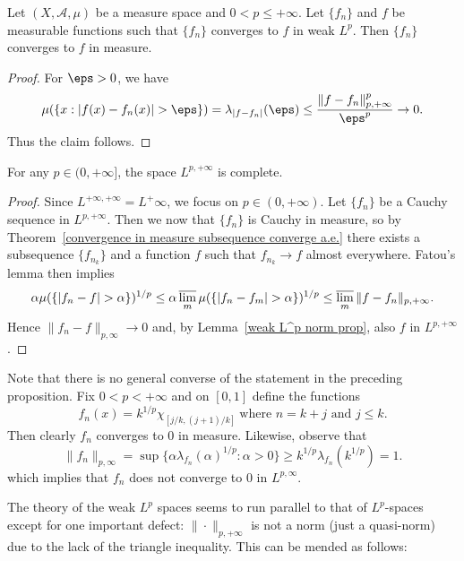 \begin{proposition}
Let $(X,\mathcal{A},\mu)$ be a measure space and $0<p\leq+\infty$. Let $\{f_n\}$ and $f$ be measurable functions such that $\{f_n\}$ converges to $f$ in weak $L^p$. Then $\{f_n\}$ converges to $f$ in measure.
\end{proposition}
\begin{proof}
For $\eps>0$, we have
\[\mu(\{x:|f(x)-f_n(x)|>\eps\})=\lambda_{|f-f_n|}(\eps)\leq\frac{\|f-f_n\|_{p,+\infty}^p}{\eps^p}\to 0.\]
Thus the claim follows.
\end{proof}
\begin{proposition}\label{weak L^p complete}
For any $p\in(0,+\infty]$, the space $L^{p,+\infty}$ is complete.
\end{proposition}
\begin{proof}
Since $L^{+\infty,+\infty}=L^+\infty$, we focus on $p\in(0,+\infty)$. Let $\{f_n\}$ be a Cauchy sequence in $L^{p,+\infty}$. Then we now that $\{f_n\}$ is Cauchy in measure, so by Theorem~\ref{convergence in measure subsequence converge a.e.} there exists a subsequence $\{f_{n_k}\}$ and a function $f$ such that $f_{n_k}\to f$ almost everywhere. Fatou’s lemma then implies
\[\alpha\mu(\{|f_n-f|>\alpha\})^{1/p}\leq\alpha\varlimsup_m\mu(\{|f_n-f_m|>\alpha\})^{1/p}\leq\varlimsup_m\|f-f_n\|_{p,+\infty}.\]
Hence $\|f_n-f\|_{p,\infty}\to 0$ and, by Lemma~\ref{weak L^p norm prop}, also $f$ in $L^{p,+\infty}$.
\end{proof}
\begin{example}
Note that there is no general converse of the statement in the preceding proposition. Fix $0<p<+\infty$ and on $[0,1]$ define the functions
\[f_n(x)=k^{1/p}\chi_{[j/k,(j+1)/k]}\ \text{where $n=k+j$ and $j\leq k$}.\]
Then clearly $f_n$ converges to $0$ in measure. Likewise, observe that
\[\|f_n\|_{p,\infty}=\sup\{\alpha\lambda_{f_n}(\alpha)^{1/p}:\alpha>0\}\geq k^{1/p}\lambda_{f_n}(k^{1/p})=1.\]
which implies that $f_n$ does not converge to $0$ in $L^{p,\infty}$.
\end{example}
The theory of the weak $L^p$ spaces seems to run parallel to that of $L^p$-spaces except for one important defect: $\|\cdot\|_{p,+\infty}$ is not a norm (just a quasi-norm) due to the lack of the triangle inequality. This can be mended as follows:
